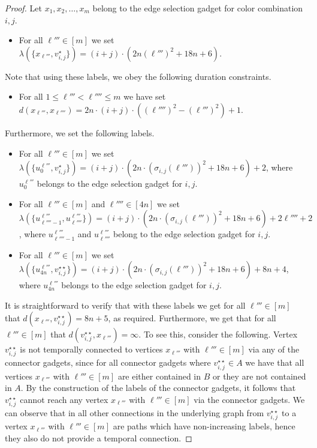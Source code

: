 \documentclass[a4paper,UKenglish,cleveref, autoref, thm-restate]{lipics-v2021}
\begin{document}
\begin{proof}
Let $x_1, x_2, \ldots, x_m$ belong to the edge selection gadget for color combination $i,j$.
\begin{itemize}
    \item For all $\ell'''\in[m]$ we set $\lambda(\{x_{\ell'''},v_{i,j}^{\star}\})=(i+j)\cdot (2n({\ell'''})^2 +18n+6)$.
\end{itemize}
Note that using these labels, we obey the following duration constraints.
\begin{itemize}
    \item For all $1\le \ell'''<\ell''''\le m$ we have set $d(x_{\ell'''},x_{\ell''''})=2n\cdot (i+j)\cdot((\ell'''')^2-(\ell''')^2)+1$.
\end{itemize}
Furthermore, we set the following labels.
\begin{itemize}
    \item  For all $\ell'''\in[m]$ we set $\lambda(\{u^{\ell'''}_{0},v_{i,j}^{\star}\})=(i+j)\cdot (2n\cdot (\sigma_{i,j}(\ell'''))^2 +18n+6)+2$, where $u^{\ell'''}_{0}$ belongs to the edge selection gadget for $i,j$.
    \item For all $\ell'''\in[m]$ and $\ell''''\in[4n]$ we set $\lambda(\{u^{\ell'''}_{\ell''''-1},u^{\ell'''}_{\ell''''}\})=(i+j)\cdot (2n\cdot (\sigma_{i,j}(\ell'''))^2 +18n+6)+2\ell''''+2$, where $u^{\ell'''}_{\ell''''-1}$ and $u^{\ell'''}_{\ell''''}$ belong to the edge selection gadget for $i,j$.
    \item  For all $\ell'''\in[m]$ we set $\lambda(\{u^{\ell'''}_{4n},v_{i,j}^{\star\star}\})=(i+j)\cdot (2n\cdot (\sigma_{i,j}(\ell'''))^2 +18n+6)+8n+4$, where $u^{\ell'''}_{4n}$ belongs to the edge selection gadget for $i,j$.
\end{itemize}

It is straightforward to verify that with these labels we get for all $\ell'''\in[m]$ that $d(x_{\ell'''},v_{i,j}^{\star\star})=8n+5$, as required.
Furthermore, we get that for all $\ell'''\in[m]$ that $d(v_{i,j}^{\star\star},x_{\ell'''})=\infty$. To see this, consider the following. Vertex $v_{i,j}^{\star\star}$ is not temporally connected to vertices $x_{\ell'''}$ with $\ell'''\in[m]$ via any of the connector gadgets, since for all connector gadgets where $v_{i,j}^{\star\star}\in A$ we have that all vertices $x_{\ell'''}$ with $\ell'''\in[m]$ are either contained in $B$ or they are not contained in $A$. By the construction of the labels of the connector gadgets, it follows that $v_{i,j}^{\star\star}$ cannot reach any vertex $x_{\ell'''}$ with $\ell'''\in[m]$ via the connector gadgets.
We can observe that in all other connections in the underlying graph from $v_{i,j}^{\star\star}$ to a vertex $x_{\ell'''}$ with $\ell'''\in[m]$ are paths which have non-increasing labels, hence they also do not provide a temporal connection.


\end{proof}
\end{document}
